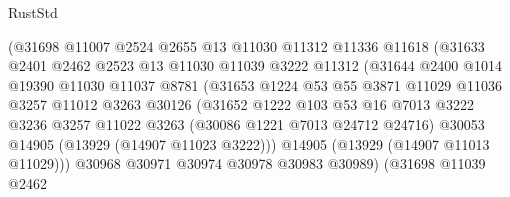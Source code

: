 \begin{lexlean}{RustStd}
\begin{coremodule}
                            (@31698
                              @11007
                              @2524
                              @2655
                              @13
                              @11030
                              @11312
                              @11336
                              @11618
                              (@31633
                                @2401
                                @2462
                                @2523
                                @13
                                @11030
                                @11039
                                @3222
                                @11312
                                (@31644
                                  @2400
                                  @1014
                                  @19390
                                  @11030
                                  @11037
                                  @8781
                                  (@31653
                                    @1224
                                    @53
                                    @55
                                    @3871
                                    @11029
                                    @11036
                                    @3257
                                    @11012
                                    @3263
                                    @30126
                                    (@31652
                                      @1222
                                      @103
                                      @53
                                      @16
                                      @7013
                                      @3222
                                      @3236
                                      @3257
                                      @11022
                                      @3263
                                      (@30086 @1221 @7013 @24712 @24716)
                                      @30053
                                      @14905
                                      (@13929 (@14907 @11023 @3222)))
                                    @14905
                                    (@13929 (@14907 @11013 @11029)))
                                  @30968
                                  @30971
                                  @30974
                                  @30978
                                  @30983
                                  @30989)
                                (@31698
                                  @11039
                                  @2462

\end{coremodule}
\end{lexlean}
